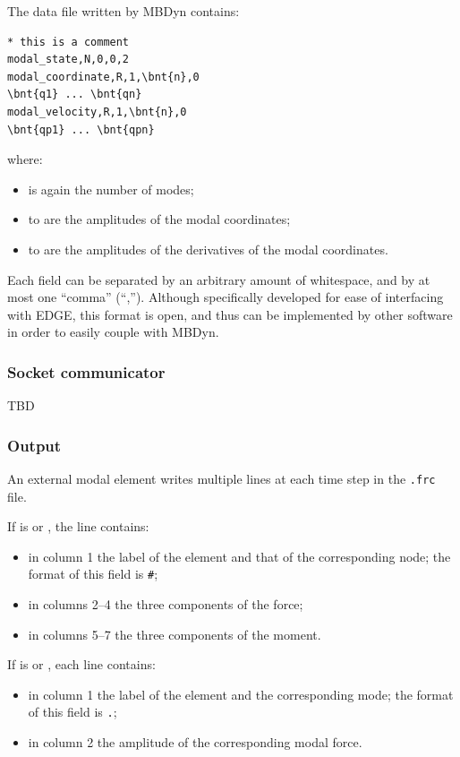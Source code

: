 The data file written by MBDyn contains:
\begin{Verbatim}[commandchars=\\\{\}]
* this is a comment
modal_state,N,0,0,2
modal_coordinate,R,1,\bnt{n},0
\bnt{q1} ... \bnt{qn}
modal_velocity,R,1,\bnt{n},0
\bnt{qp1} ... \bnt{qpn}
\end{Verbatim}
where:
\begin{itemize}
\item {} is again the number of modes;
\item {} to  are the amplitudes of the modal coordinates;
\item {} to  are the amplitudes of the derivatives
	of the modal coordinates.
\end{itemize}

Each field can be separated by an arbitrary amount of whitespace,
and by at most one ``comma'' (``,'').
Although specifically developed for ease of interfacing with EDGE,
this format is open, and thus can be implemented by other software
in order to easily couple with MBDyn.



\subsubsection{Socket communicator}
TBD



\subsubsection{Output}
An external modal element writes multiple lines at each time step
in the \texttt{.frc} file.

If  is  or , the line contains:
\begin{itemize}
\item in column 1 the label of the element and that of the corresponding node;
	the format of this field is \texttt{\#};
\item in columns 2--4 the three components of the force;
\item in columns 5--7 the three components of the moment.
\end{itemize}
If  is  or , each line contains:
\begin{itemize}
\item in column 1 the label of the element and the corresponding mode;
	the format of this field is \texttt{.};
\item in column 2 the amplitude of the corresponding modal force.
\end{itemize}



